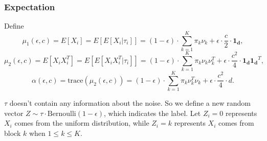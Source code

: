 \documentclass[a4paper]{article}
\begin{document}
\subsubsection{Expectation}

Define
\[
	\mu_1(\epsilon, c) = E [ X_i ] = E [ E[ X_i | \tau_i ] ] = (1 - \epsilon) \cdot \sum_{k = 1}^K \pi_k \nu_k + \epsilon \cdot \frac{c}{2} \cdot \boldsymbol{1_d},
\]
\[
	\mu_2(\epsilon, c) = E[X_i X_i^T] = E[ E[ X_i X_i^T |\tau_i ]] = (1 - \epsilon) \cdot \sum_{k = 1}^K \pi_k \nu_k \nu_k^T
+ \epsilon \cdot \frac{c^2}{4} \cdot \boldsymbol{1_d} \boldsymbol{1_d}^T,
\]
\[
	\alpha(\epsilon, c) = \text{trace} \left( \mu_2(\epsilon, c) \right)
    = (1 - \epsilon) \cdot \sum_{k = 1}^K \pi_k \nu_k^T \nu_k
+ \epsilon \cdot \frac{c^2}{4} \cdot d.
\]

$\tau$ doesn't contain any information about the noise. So we define a new random vector $Z \sim \tau \cdot \text{Bernoulli} \left(1 - \epsilon \right)$, which indicates the label. Let $Z_i = 0$ represents $X_i$ comes from the uniform distribution, while $Z_i = k$ represents $X_i$ comes from block $k$ when $1 \le k \le K$.
\end{document}
